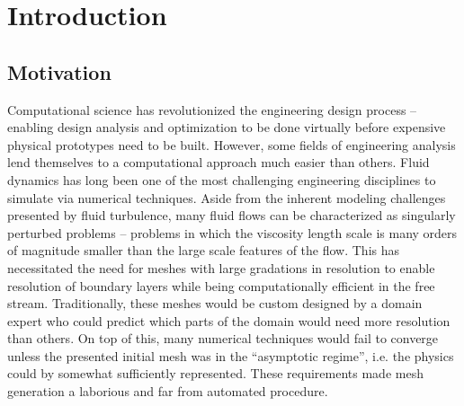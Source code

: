 \documentclass[Dissertation.tex]{subfiles}
\begin{document}
\chapter{Introduction}
\section{Motivation}

Computational science has revolutionized the engineering design process -- enabling design analysis
and optimization to be done virtually before expensive physical prototypes need to be built.
However, some fields of engineering analysis lend themselves to a computational approach much easier
than others.
Fluid dynamics has long been one of the most challenging engineering disciplines to simulate via numerical techniques.
Aside from the inherent modeling challenges presented by fluid turbulence, many fluid flows can be characterized as singularly perturbed problems
-- problems in which the viscosity length scale is many orders of magnitude smaller than the large scale features of the flow.
This has necessitated the need for meshes with large gradations in resolution to enable resolution of boundary layers while being computationally efficient in the free stream.
Traditionally, these meshes would be custom designed by a domain expert who could predict which parts of the domain would need more resolution than others.
On top of this, many numerical techniques would fail to converge unless the presented initial mesh was in the ``asymptotic regime'',
i.e. the physics could by somewhat sufficiently represented.
These requirements made mesh generation a laborious and far from automated procedure.
\end{document}
